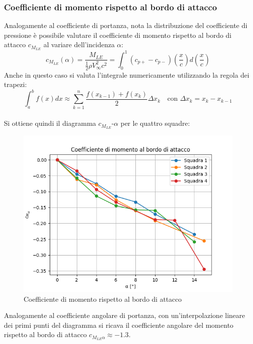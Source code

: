 \subsubsection{Coefficiente di momento rispetto al bordo di attacco}
Analogamente al coefficiente di portanza, nota la distribuzione del coefficiente di pressione è possibile valutare il coefficiente di momento rispetto al bordo di attacco $c_{M_{LE}}$ al variare dell'incidenza $\alpha$:
\begin{equation*}
    c_{M_{LE}}(\alpha) = \frac{M_{LE}}{\frac12 \rho V_\infty^2 c^2} = \int_0^1 (c_{p+}-c_{p-})\left( \frac xc \right) d \left( \frac xc \right)
\end{equation*}
Anche in questo caso si valuta l'integrale numericamente utilizzando la regola dei trapezi:
\begin{equation*}
    \int_a^b f(x)dx \approx \sum_{k=1}^n \frac{f(x_{k-1}) + f(x_k)}2 \Delta x_k \quad \text{con } \Delta x_k = x_k - x_{k-1}
\end{equation*}\\

\noindent Si ottiene quindi il diagramma $c_{M_{LE}}$-$\alpha$ per le quattro squadre:
\begin{figure}[H]
    \centering
    \includegraphics[width=.85\textwidth]{images/5/cmle.png}
    \caption{Coefficiente di momento rispetto al bordo di attacco}
\end{figure}

\noindent Analogamente al coefficiente angolare di portanza, con un'interpolazione lineare dei primi punti del diagramma si ricava il coefficiente angolare del momento rispetto al bordo di attacco $c_{M_{LE}\alpha} \approx -1.3$.

\newpage
